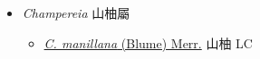 
  \begin{itemize}
 \item[] \textit{Champereia} 山柚屬
                                
  \begin{itemize}
        \item[] \href{http://www.theplantlist.org/tpl1.1/search?q=Champereia+manillana}{\textit{C. manillana} (Blume) Merr.}   山柚   LC
  \end{itemize}
  \end{itemize}
